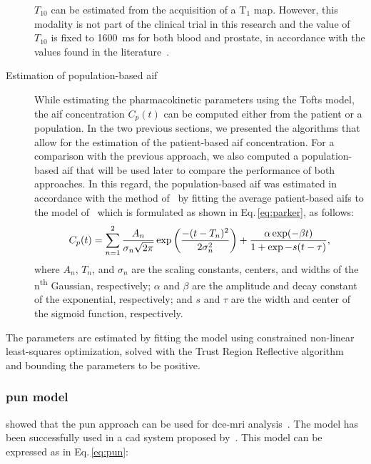 \begin{description}
      $T_{10}$ can be estimated from the acquisition of a T$_1$ map.
      However, this modality is not part of the clinical trial in this research and the value of $T_{10}$ is fixed to \SI{1600}{\ms} for both blood and prostate, in accordance with the values found in the literature~\cite{fennessy2015quantitative,de2004mr,carr2011magnetic}.
      \item[Estimation of population-based \ac{aif}] While estimating
        the pharmacokinetic parameters using the Tofts model, the \ac{aif} concentration $C_p(t)$ can be computed either from the patient or a population.
        In the two previous sections, we presented the algorithms that
        allow for the estimation of the patient-based \ac{aif} concentration.
        For a comparison with the previous approach, we also computed a population-based \ac{aif} that will be used later to compare the performance of both approaches.
        In this regard, the population-based \ac{aif} was estimated in
        accordance with the method of~\cite{meng2010comparison} by
        fitting the average patient-based \ac{aif}s to the model
        of~\cite{parker2006experimentally} which is formulated as
        shown in Eq.\,\eqref{eq:parker}, as follows:
        \begin{equation}\footnotesize
          C_p(t) = \sum_{n=1}^{2} \frac{A_n}{\sigma_n \sqrt{2 \pi}} \exp\left(\frac{- (t- T_n)^2}{2\sigma_{n}^{2}}\right) + \frac{\alpha \exp(-\beta t)}{1 + \exp{-s (t - \tau)}} ,
          \label{eq:parker}
        \end{equation}
        \noindent where $A_n$, $T_n$, and $\sigma_n$ are the scaling
        constants, centers, and widths of the n\textsuperscript{th}
        Gaussian, respectively; $\alpha$ and $\beta$ are the amplitude
        and decay constant of the exponential, respectively; and $s$ and $\tau$ are the width and center of the sigmoid function, respectively.
\end{description}

The parameters are estimated by fitting the model using constrained non-linear least-squares optimization, solved with the Trust Region Reflective algorithm~\cite{sorensen1982newton} and bounding the parameters to be positive.

\subsubsection{\acs*{pun} model}\label{sec:pun}

\citeauthor{gliozzi2011phenomenological} showed that the \ac{pun} approach can be used for \ac{dce}-\ac{mri} analysis~\cite{gliozzi2011phenomenological}.
The model has been successfully used in a \ac{cad} system proposed by~\cite{giannini2015fully}.
This model can be expressed as in Eq.\,\eqref{eq:pun}:

